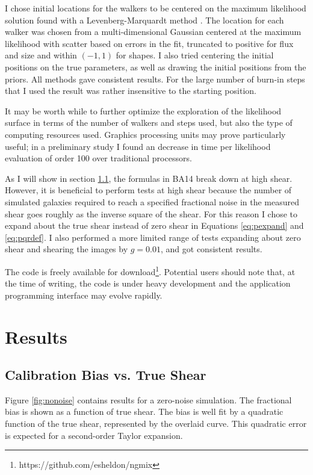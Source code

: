 \documentclass[usegraphicx,usenatbib]{mn2e}
\begin{document}
I chose initial locations for the walkers to be centered on the maximum
likelihood solution found with a Levenberg-Marquardt method \citep{Lev44}. The
location for each walker was chosen from a multi-dimensional Gaussian centered
at the maximum likelihood with scatter based on errors in the fit, truncated to
positive for flux and size and within $(-1,1)$ for shapes.  I also tried
centering the initial positions on the true parameters, as well as drawing the
initial positions from the priors.  All methods gave consistent results.  For
the large number of burn-in steps that I used the result was rather insensitive
to the starting position.

It may be worth while to further optimize the exploration of the likelihood
surface in terms of the number of walkers and steps used, but also the type of
computing resources used.  Graphics processing units may prove particularly
useful; in a preliminary study I found an decrease in time per likelihood
evaluation of order 100 over traditional processors.


As I will show in section \ref{sec:truebias}, the formulas in BA14 break down
at high shear.  However, it is beneficial to perform tests at high shear
because the number of simulated galaxies required to reach a specified
fractional noise in the measured shear goes roughly as the inverse square of
the shear.  For this reason I chose to expand about the true shear instead of
zero shear in Equations \ref{eq:pexpand} and \ref{eq:pqrdef}.  I also performed
a more limited range of tests expanding about zero shear and shearing the
images by $g=0.01$, and got consistent results. 

The code is freely available for
download\footnote{https://github.com/esheldon/ngmix}.  Potential users should
note that, at the time of writing, the code is under heavy development and the
application programming interface may evolve rapidly.

\section{Results} \label{sec:results}

\subsection{Calibration Bias vs. True Shear} \label{sec:truebias}

Figure \ref{fig:nonoise} contains results for a zero-noise simulation.  The
fractional bias is shown as a function of true shear.  The bias is well fit by
a quadratic function of the true shear, represented by the overlaid curve. This
quadratic error is expected for a second-order Taylor expansion.
\end{document}
